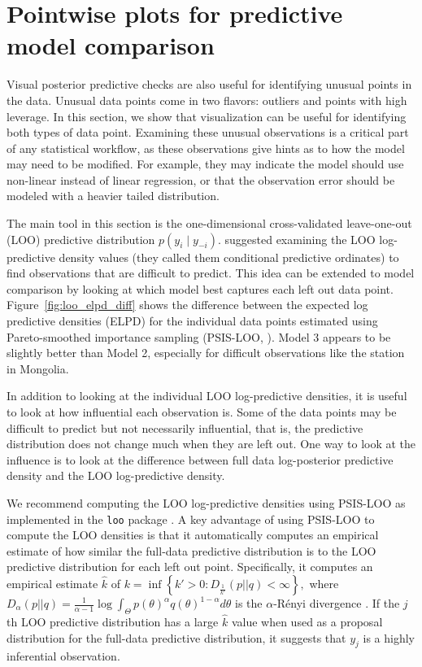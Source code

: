 \documentclass{statsoc}
\begin{document}
\section{Pointwise plots for predictive model comparison}
Visual posterior predictive checks are also useful for identifying unusual
points in the data. Unusual data points come in two flavors: outliers and points
with high leverage.  In this section, we show that visualization can be useful
for identifying both types of data point. Examining these unusual observations
is a critical part of any statistical workflow, as these observations give hints
as to how the model may need to be modified. For example, they may indicate the
model should use non-linear instead of linear regression, or that the
observation error should be modeled with a heavier tailed distribution.

The main tool in this section is the one-dimensional cross-validated
leave-one-out (LOO) predictive distribution $p(y_i \mid y_{-i})$.
\citet{GelfandDeyChang1992} suggested examining the LOO log-predictive density
values (they called them conditional predictive ordinates) to find observations
that are difficult to predict. This idea can be extended to model comparison by
looking at which model best captures each left out data point.
Figure~\ref{fig:loo_elpd_diff} shows the difference between the expected log
predictive densities (ELPD) for the individual data points estimated using
Pareto-smoothed importance sampling (PSIS-LOO, \citet{vehtari2016psis,
vehtari2017practical}). Model 3 appears to be slightly better than Model 2,
especially for difficult observations like the station in Mongolia.

In addition to looking at the individual LOO log-predictive densities, it is
useful to look at how influential each observation is. Some of the data points
may be difficult to predict but not necessarily influential, that is, the
predictive distribution does not change much when they are left out. One way to
look at the influence is to look at the difference between full data
log-posterior predictive density and the LOO log-predictive density.

We recommend computing the LOO log-predictive densities using PSIS-LOO as
implemented in the {\tt loo} package \citep{looRpackage}. A key advantage of
using PSIS-LOO to compute the LOO densities is that it automatically computes an
empirical estimate of how similar the full-data predictive distribution is to
the LOO predictive distribution for each left out point. Specifically, it
computes an empirical estimate $\hat{k}$ of
$k=\inf\left\{ k'>0 : D_{\frac{1}{k'}} \left(  p || q  \right)<\infty \right\},$
where
$D_{\alpha} \left(  p || q  \right) =
\frac{1}{\alpha-1} \log \int_{\Theta} p(\theta)^{\alpha} q(\theta)^{1-\alpha}  d \theta$
is the $\alpha$-R\'{e}nyi divergence \citep{yao2018yes}.
If the $j$th LOO predictive distribution has a large $\hat{k}$ value when used as
a proposal distribution for the full-data predictive distribution, it suggests
that $y_j$ is a highly inferential observation.
\end{document}

